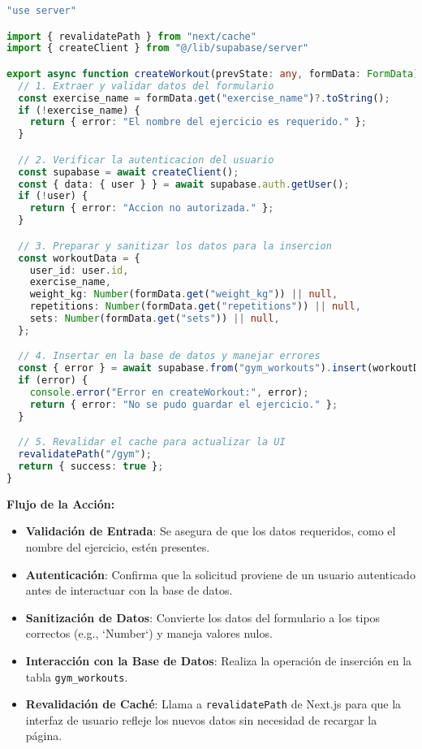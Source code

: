 \documentclass[12pt,a4paper]{article}
\begin{document}
\begin{lstlisting}[language=typescript, caption={Función `createWorkout` en `gym-actions.ts`}]
"use server"

import { revalidatePath } from "next/cache"
import { createClient } from "@/lib/supabase/server"

export async function createWorkout(prevState: any, formData: FormData) {
  // 1. Extraer y validar datos del formulario
  const exercise_name = formData.get("exercise_name")?.toString();
  if (!exercise_name) {
    return { error: "El nombre del ejercicio es requerido." };
  }

  // 2. Verificar la autenticacion del usuario
  const supabase = await createClient();
  const { data: { user } } = await supabase.auth.getUser();
  if (!user) {
    return { error: "Accion no autorizada." };
  }

  // 3. Preparar y sanitizar los datos para la insercion
  const workoutData = {
    user_id: user.id,
    exercise_name,
    weight_kg: Number(formData.get("weight_kg")) || null,
    repetitions: Number(formData.get("repetitions")) || null,
    sets: Number(formData.get("sets")) || null,
  };

  // 4. Insertar en la base de datos y manejar errores
  const { error } = await supabase.from("gym_workouts").insert(workoutData);
  if (error) {
    console.error("Error en createWorkout:", error);
    return { error: "No se pudo guardar el ejercicio." };
  }

  // 5. Revalidar el cache para actualizar la UI
  revalidatePath("/gym");
  return { success: true };
}
\end{lstlisting}

\textbf{Flujo de la Acción:}
\begin{itemize}
    \item \textbf{Validación de Entrada}: Se asegura de que los datos requeridos, como el nombre del ejercicio, estén presentes.
    \item \textbf{Autenticación}: Confirma que la solicitud proviene de un usuario autenticado antes de interactuar con la base de datos.
    \item \textbf{Sanitización de Datos}: Convierte los datos del formulario a los tipos correctos (e.g., `Number`) y maneja valores nulos.
    \item \textbf{Interacción con la Base de Datos}: Realiza la operación de inserción en la tabla \texttt{gym\_workouts}.
    \item \textbf{Revalidación de Caché}: Llama a \texttt{revalidatePath} de Next.js para que la interfaz de usuario refleje los nuevos datos sin necesidad de recargar la página.
\end{itemize}
\end{document}
